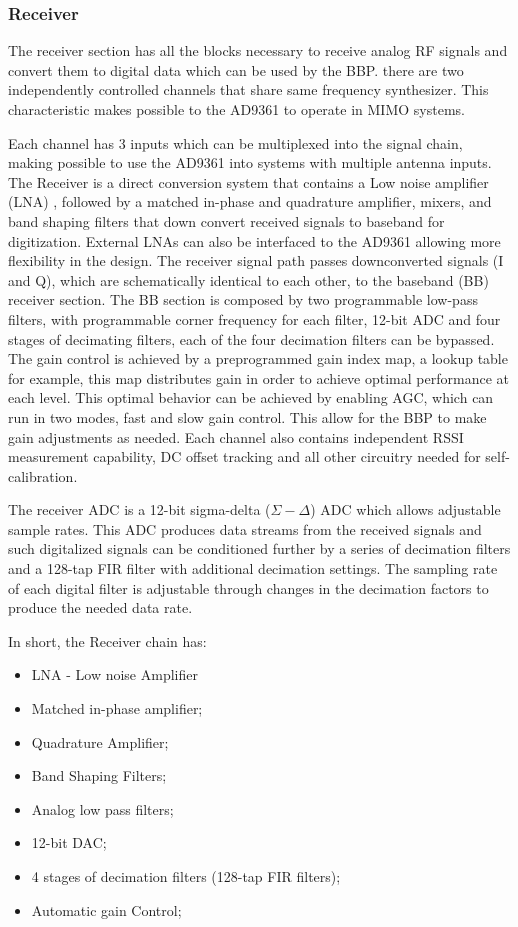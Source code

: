 \subsubsection{Receiver}

The receiver section has all the blocks necessary to receive analog RF signals and convert them to digital data which can be used by the BBP. there are two independently controlled channels that share same frequency synthesizer. This characteristic makes possible to the AD9361 to operate in MIMO systems.

Each channel has 3 inputs which can be multiplexed into the signal chain, making possible to use the AD9361 into systems with multiple antenna inputs. The Receiver is a direct conversion system that contains a Low noise amplifier (LNA) , followed by a matched in-phase and quadrature amplifier, mixers, and band shaping filters that down convert received signals to baseband for digitization. External LNAs can also be interfaced to the AD9361 allowing more flexibility in the design.
The receiver signal path passes downconverted signals (I and Q), which are schematically identical to each other,  to the baseband (BB) receiver section. The BB section is composed by two programmable low-pass filters, with programmable corner frequency for each filter, 12-bit ADC and four stages of decimating filters, each of the four decimation filters can be bypassed.
The gain control is achieved by a preprogrammed gain index map, a lookup table for example, this map distributes gain in order to achieve optimal performance at each level. This optimal behavior can be achieved by enabling AGC, which can run in two modes, fast and slow gain control. This allow for the BBP to make gain adjustments as needed.
Each channel also contains independent RSSI measurement capability, DC offset tracking and all other circuitry needed for self-calibration.

The receiver ADC is a 12-bit sigma-delta ($\Sigma-\Delta$) ADC which allows adjustable sample rates. This ADC produces data streams from the received signals and such digitalized signals can be conditioned further by a series of decimation filters and a 128-tap FIR filter with additional decimation settings.
The sampling rate of each digital filter is adjustable through changes in the decimation factors to produce the needed data rate.

In short, the Receiver chain has:

\begin{itemize}
	\item LNA - Low noise Amplifier
	\item Matched in-phase amplifier;
	\item Quadrature Amplifier;
	\item Band Shaping Filters;
	\item Analog low pass filters;
	\item 12-bit DAC;
	\item 4 stages of decimation filters (128-tap FIR filters);
	\item Automatic gain Control;
\end{itemize}

